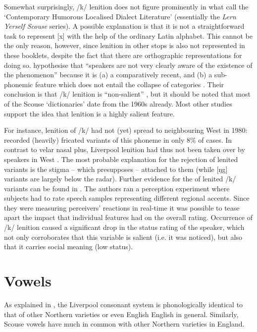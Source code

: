 Somewhat surprisingly, /k/ lenition does not figure prominently in what \textcite{honeybonewatson2013} call the `Contemporary Humorous Localised Dialect Literature' (essentially the \emph{Lern Yerself Scouse} series).
A possible explanation is that it is not a straightforward task to represent [x] with the help of the ordinary Latin alphabet.
This cannot be the only reason, however, since lenition in other stops is also not represented in these booklets, despite the fact that there are orthographic representations for doing so.
\textcite{honeybonewatson2013} hypothesise that ``speakers are not very clearly aware of the existence of the phenomenon'' because it is (a) a comparatively recent, and (b) a sub-phonemic feature which does not entail the collapse of categories \parencite[cf.][329--331]{honeybonewatson2013}.
Their conclusion is that /k/ lenition is ``non-salient'' \parencite[333]{honeybonewatson2013}, but it should be noted that most of the Scouse `dictionaries' date from the 1960s already.
Most other studies support the idea that lenition is a highly salient feature.

For instance, lenition of /k/ had not (yet) spread to neighbouring West  in 1980: \textcite[97]{newbrook1999} recorded (heavily) fricated variants of this phoneme in only 8\% of cases.
In contrast to velar nasal plus, Liverpool lenition had thus not been taken over by speakers in West .
The most probable explanation for the rejection of lenited variants is the stigma -- which presupposes  -- attached to them (while [ŋg] variants are largely below the radar).
Further evidence for the  of lenited /k/ variants can be found in \citealt{watsonclark2015}.
The authors ran a perception experiment where subjects had to rate speech samples representing different regional accents.
Since they were measuring perceivers' reactions in real-time it was possible to tease apart the impact that individual features had on the overall rating.
Occurrence of /k/ lenition caused a significant drop in the status rating of the speaker, which not only corroborates that this variable is salient (i.e. it was noticed), but also that it carries social meaning (low status).

	\section{Vowels}\label{sec.var.vow}

As explained in , the Liverpool consonant system is phonologically identical to that of other Northern varieties or even English English in general.
Similarly, Scouse vowels have much in common with other Northern varieties in England.

